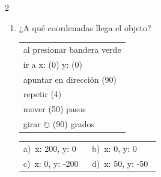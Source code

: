 \documentclass[11pt,a4paper]{article}
\begin{document}
\begin{multicols}{2}
\begin{enumerate}[label=\textbf{\arabic*.},leftmargin=*,itemsep=10pt,topsep=0pt]
\item \begin{minipage}[t]{\linewidth}
¿A qué coordenadas llega el objeto?
\par\vspace{3pt}\hspace*{1em}\begin{tabular}{@{}l@{}}\ttfamily\small al presionar bandera verde \\
\ttfamily\small ir a x: (0) y: (0) \\
\ttfamily\small apuntar en dirección (90) \\
\ttfamily\small repetir (4) \\
\ttfamily\small \hspace*{1.5em}mover (50) pasos \\
\ttfamily\small \hspace*{1.5em}girar $\circlearrowright$ (90) grados
\end{tabular}\par

\vspace{4pt}
\begin{tabular}{@{}>{\raggedright\arraybackslash}p{0.47\linewidth}>{\raggedright\arraybackslash}p{0.47\linewidth}@{}}
a)~x: 200, y: 0 & b)~x: 0, y: 0 \\
c)~x: 0, y: -200 & d)~x: 50, y: -50 \\
\end{tabular}
\end{minipage}

\end{enumerate}
\end{multicols}
\end{document}

